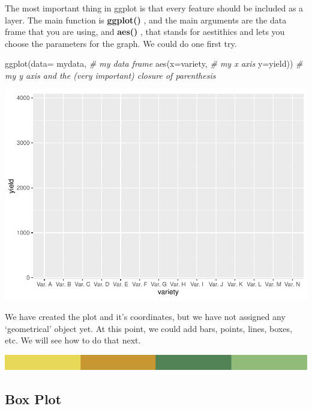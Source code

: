 \documentclass[
]{book}
\newenvironment{Shaded}{\begin{snugshade}}{\end{snugshade}}
\newcommand{\AttributeTok}[1]{\textcolor[rgb]{0.77,0.63,0.00}{#1}}
\newcommand{\CommentTok}[1]{\textcolor[rgb]{0.56,0.35,0.01}{\textit{#1}}}
\newcommand{\FunctionTok}[1]{\textcolor[rgb]{0.00,0.00,0.00}{#1}}
\newcommand{\NormalTok}[1]{#1}
\begin{document}
The most important thing in ggplot is that every feature should be included as a layer. The main function is \textbf{ggplot() }, and the main arguments are the data frame that you are using, and \textbf{aes() }, that stands for aestithics and lets you choose the parameters for the graph. We could do one first try.

\begin{Shaded}
\begin{Highlighting}[]
\FunctionTok{ggplot}\NormalTok{(}\AttributeTok{data=}\NormalTok{ mydata,   }\CommentTok{\# my data frame}
       \FunctionTok{aes}\NormalTok{(}\AttributeTok{x=}\NormalTok{variety,      }\CommentTok{\# my x axis}
           \AttributeTok{y=}\NormalTok{yield))   }\CommentTok{\# my y axis and the (very important) closure of parenthesis}
\end{Highlighting}
\end{Shaded}

\includegraphics{PPB-Toolkit-for-R-and-R-Studio_files/figure-latex/unnamed-chunk-66-1.pdf}

We have created the plot and it's coordinates, but we have not assigned any `geometrical' object yet. At this point, we could add bars, points, lines, boxes, etc. We will see how to do that next.

\includegraphics{rsrstrip.png}

\hypertarget{box-plot}{%
\subsection{Box Plot}\label{box-plot}}
\end{document}
